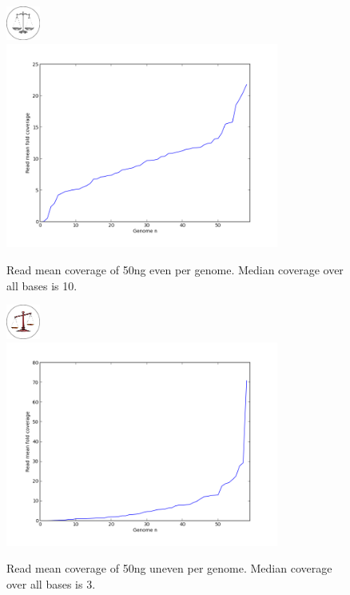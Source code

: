 \documentclass[a4paper,12pt]{report}
\begin{document}
\begin{figure}[ht!]
  \centering
    \includegraphics[width=0.1\textwidth]{figures/logos/even.png}\\
  \centering
      \includegraphics[width=0.8\textwidth,trim=35 20 35 33, clip]{figures/notebooks/chris-mock-even-distribution.png}
  \caption{Read mean coverage of 50ng even per genome. Median coverage over all
  bases is 10.}
  \label{fig:coverage50ngeven}
\end{figure}
\begin{figure}[ht!]
  \centering
    \includegraphics[width=0.1\textwidth]{figures/logos/uneven.png}\\
  \centering
    \includegraphics[width=0.8\textwidth,trim=35 20 35 33, clip]{figures/notebooks/chris-mock-uneven-distribution.png}
  \caption{Read mean coverage of 50ng uneven per genome. Median coverage over
  all bases is 3.}
  \label{fig:coverage50nguneven}
\end{figure}
\end{document}
